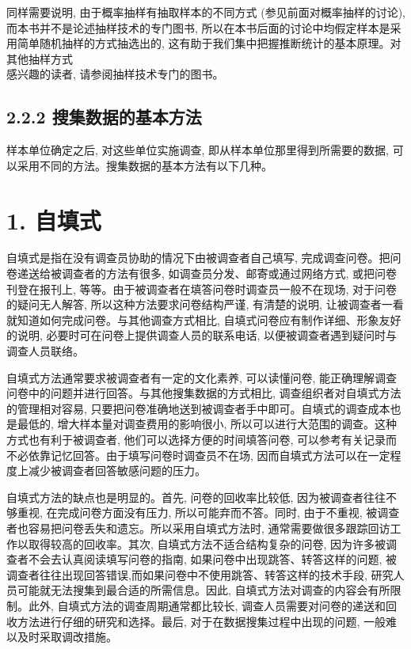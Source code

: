 \documentclass[10pt]{article}
\begin{document}
\begin{CJK*}{UTF8}{bsmi}
同样需要说明, 由于概率抽样有抽取样本的不同方式 (参见前面对概率抽样的讨论),而本书并不是论述抽样技术的专门图书, 所以在本书后面的讨论中均假定样本是采用简单随机抽样的方式抽选出的, 这有助于我们集中把握推断统计的基本原理。对其他抽样方式\\
感兴趣的读者, 请参阅抽样技术专门的图书。

\subsection*{2.2.2 搜集数据的基本方法}
样本单位确定之后, 对这些单位实施调查, 即从样本单位那里得到所需要的数据, 可以采用不同的方法。搜集数据的基本方法有以下几种。

\section*{1. 自填式}
自填式是指在没有调查员协助的情况下由被调查者自己填写, 完成调查问卷。把问卷递送给被调查者的方法有很多, 如调查员分发、邮寄或通过网络方式, 或把问卷刊登在报刊上, 等等。由于被调查者在填答问卷时调查员一般不在现场, 对于问卷的疑问无人解答, 所以这种方法要求问卷结构严谨, 有清楚的说明, 让被调查者一看就知道如何完成问卷。与其他调查方式相比, 自填式问卷应有制作详细、形象友好的说明, 必要时可在问卷上提供调查人员的联系电话, 以便被调查者遇到疑问时与调查人员联络。

自填式方法通常要求被调查者有一定的文化素养, 可以读懂问卷, 能正确理解调查问卷中的问题并进行回答。与其他搜集数据的方式相比, 调查组织者对自填式方法的管理相对容易, 只要把问卷准确地送到被调查者手中即可。自填式的调查成本也是最低的, 增大样本量对调查费用的影响很小, 所以可以进行大范围的调查。这种方式也有利于被调查者, 他们可以选择方便的时间填答问卷, 可以参考有关记录而不必依靠记忆回答。由于填写问卷时调查员不在场, 因而自填式方法可以在一定程度上减少被调查者回答敏感问题的压力。

自填式方法的缺点也是明显的。首先, 问卷的回收率比较低, 因为被调查者往往不够重视, 在完成问卷方面没有压力, 所以可能弃而不答。同时, 由于不重视, 被调查者也容易把问卷丢失和遗忘。所以采用自填式方法时, 通常需要做很多跟踪回访工作以取得较高的回收率。其次, 自填式方法不适合结构复杂的问卷, 因为许多被调查者不会去认真阅读填写问卷的指南, 如果问卷中出现跳答、转答这样的问题, 被调查者往往出现回答错误,而如果问卷中不使用跳答、转答这样的技术手段, 研究人员可能就无法搜集到最合适的所需信息。因此, 自填式方法对调查的内容会有所限制。此外, 自填式方法的调查周期通常都比较长, 调查人员需要对问卷的递送和回收方法进行仔细的研究和选择。最后, 对于在数据搜集过程中出现的问题, 一般难以及时采取调改措施。


\end{CJK*}
\end{document}
